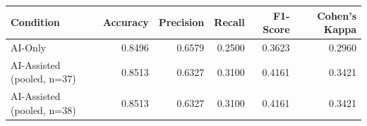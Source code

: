 \begin{tabular}{lrrrrr}
\toprule
Condition & Accuracy & Precision & Recall & F1-Score & Cohen's Kappa \\
\midrule
AI-Only & 0.8496 & 0.6579 & 0.2500 & 0.3623 & 0.2960 \\
AI-Assisted (pooled, n=37) & 0.8513 & 0.6327 & 0.3100 & 0.4161 & 0.3421 \\
AI-Assisted (pooled, n=38) & 0.8513 & 0.6327 & 0.3100 & 0.4161 & 0.3421 \\
\bottomrule
\end{tabular}
